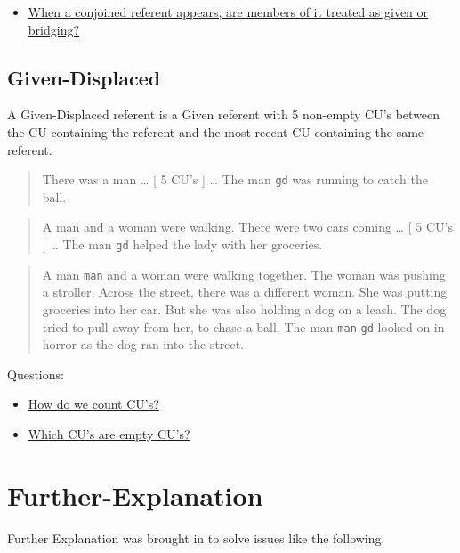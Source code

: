 \documentclass[
]{book}
\providecommand{\tightlist}{%
  \setlength{\itemsep}{0pt}\setlength{\parskip}{0pt}}
\begin{document}
\begin{itemize}
\tightlist
\item
  \protect\hyperlink{conjoined-referent-members}{When a conjoined referent appears, are members of it treated as given or bridging?}
\end{itemize}

\hypertarget{given-displaced}{%
\subsection{Given-Displaced}\label{given-displaced}}

A Given-Displaced referent is a Given referent with 5 non-empty CU's between the CU containing the referent and the most recent CU containing the same referent.

\begin{quote}
There was a man \ldots{}
{[} 5 CU's {]} \ldots{}
The man \texttt{gd} was running to catch the ball.
\end{quote}

\begin{quote}
A man and a woman were walking.
There were two cars coming \ldots{}
{[} 5 CU's {]} \ldots{}
The man \texttt{gd} helped the lady with her groceries.
\end{quote}

\begin{quote}
A man \texttt{man} and a woman were walking together.
The woman was pushing a stroller.
Across the street, there was a different woman.
She was putting groceries into her car.
But she was also holding a dog on a leash.
The dog tried to pull away from her, to chase a ball.
The man \texttt{man} \texttt{gd} looked on in horror as the dog ran into the street.
\end{quote}

Questions:

\begin{itemize}
\tightlist
\item
  \protect\hyperlink{counting-cus}{How do we count CU's?}
\item
  \protect\hyperlink{empty-cus}{Which CU's are empty CU's?}
\end{itemize}

\hypertarget{further-explanation}{%
\section{Further-Explanation}\label{further-explanation}}

Further Explanation was brought in to solve issues like the following:
\end{document}

